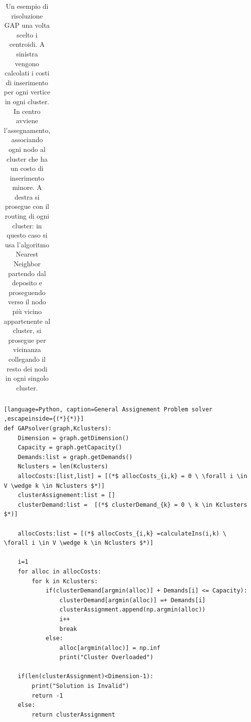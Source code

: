 \documentclass[]{article}
\begin{document}
\begin{table}
\begin{tabular}{c|c|c}
	\end{tabular}
	\caption{Un esempio di risoluzione GAP una volta scelto i centroidi. A sinistra vengono calcolati i costi di inserimento per ogni vertice in ogni cluster. In centro avviene l'assegnamento, associando ogni nodo al cluster che ha un costo di inserimento minore. A destra si prosegue con il routing di ogni cluster: in questo caso si usa l'algoritmo Nearest Neighbor partendo dal deposito e proseguendo verso il nodo più vicino appartenente al cluster, si prosegue per vicinanza collegando il resto dei nodi in ogni singolo cluster.}
	\label{Table:2}
\end{table}

\pagebreak

\begin{lstlisting}[language=Python, caption=General Assignement Problem solver ,escapeinside={(*}{*)}]
def GAPsolver(graph,Kclusters):
	Dimension = graph.getDimension()
	Capacity = graph.getCapacity()
	Demands:list = graph.getDemands()
	Nclusters = len(Kclusters)
	allocCosts:[list,list] = [(*$ allocCosts_{i,k} = 0 \ \forall i \in V \wedge k \in Nclusters $*)]
	clusterAssignement:list = []
	clusterDemand:list =  [(*$ clusterDemand_{k} = 0 \ k \in Kclusters $*)]
	
	allocCosts:list = [(*$ allocCosts_{i,k} =calculateIns(i,k) \ \forall i \in V \wedge k \in Nclusters $*)]
	
	i=1
	for alloc in allocCosts:
		for k in Kclusters:
			if(clusterDemand[argmin(alloc)] + Demands[i] <= Capacity):
				clusterDemand[argmin(alloc)] =+ Demands[i]
				clusterAssignment.append(np.argmin(alloc))
				i++
				break
			else:
				alloc[argmin(alloc)] = np.inf
				print("Cluster Overloaded")

	if(len(clusterAssignment)<Dimension-1):
		print("Solution is Invalid")
		return -1
	else:
		return clusterAssignment
															
\end{lstlisting}
\end{document}
